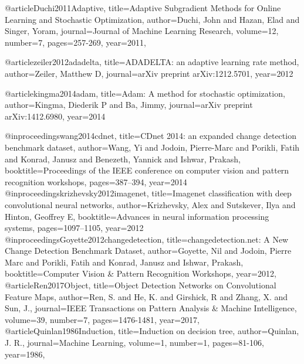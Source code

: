 \documentclass[]{article}
\begin{document}
@article{Duchi2011Adaptive,
	title={Adaptive Subgradient Methods for Online Learning and Stochastic Optimization},
	author={Duchi, John and Hazan, Elad and Singer, Yoram},
	journal={Journal of Machine Learning Research},
	volume={12},
	number={7},
	pages={257-269},
	year={2011},
}

@article{zeiler2012adadelta,
	title={ADADELTA: an adaptive learning rate method},
	author={Zeiler, Matthew D},
	journal={arXiv preprint arXiv:1212.5701},
	year={2012}
}

@article{kingma2014adam,
	title={Adam: A method for stochastic optimization},
	author={Kingma, Diederik P and Ba, Jimmy},
	journal={arXiv preprint arXiv:1412.6980},
	year={2014}
}

@inproceedings{wang2014cdnet,
	title={CDnet 2014: an expanded change detection benchmark dataset},
	author={Wang, Yi and Jodoin, Pierre-Marc and Porikli, Fatih and Konrad, Janusz and Benezeth, Yannick and Ishwar, Prakash},
	booktitle={Proceedings of the IEEE conference on computer vision and pattern recognition workshops},
	pages={387--394},
	year={2014}
}
@inproceedings{krizhevsky2012imagenet,
	title={Imagenet classification with deep convolutional neural networks},
	author={Krizhevsky, Alex and Sutskever, Ilya and Hinton, Geoffrey E},
	booktitle={Advances in neural information processing systems},
	pages={1097--1105},
	year={2012}
}
@inproceedings{Goyette2012changedetection,
	title={changedetection.net: A New Change Detection Benchmark Dataset},
	author={Goyette, Nil and Jodoin, Pierre Marc and Porikli, Fatih and Konrad, Janusz and Ishwar, Prakash},
	booktitle={Computer Vision & Pattern Recognition Workshops},
	year={2012},
}
@article{Ren2017Object,
	title={Object Detection Networks on Convolutional Feature Maps},
	author={Ren, S. and He, K. and Girshick, R and Zhang, X. and Sun, J.},
	journal={IEEE Transactions on Pattern Analysis & Machine Intelligence},
	volume={39},
	number={7},
	pages={1476-1481},
	year={2017},
}
@article{Quinlan1986Induction,
	title={Induction on decision tree},
	author={Quinlan, J. R.},
	journal={Machine Learning},
	volume={1},
	number={1},
	pages={81-106},
	year={1986},
}
\end{document}
